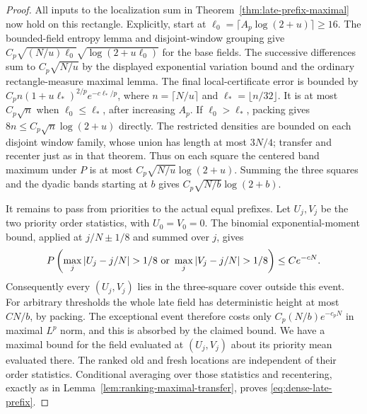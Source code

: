 \documentclass[11pt,letterpaper]{article}
\begin{document}
\begin{proof}
All inputs to the localization sum in
Theorem~\ref{thm:late-prefix-maximal} now hold on this
rectangle. Explicitly, start at
$\ell_0=\lceil A_p\log(2+u)\rceil\ge16$.
The bounded-field entropy lemma and disjoint-window
grouping give
$C_p\sqrt{(N/u)\ell_0}\sqrt{\log(2+u\ell_0)}$
for the base fields. The successive differences sum to
$C_p\sqrt{N/u}$ by the displayed exponential variation
bound and the ordinary rectangle-measure maximal lemma.
The final local-certificate error is bounded by
$C_p n(1+u\ell_*)^{2/p}e^{-c\ell_*/p}$, where
$n=\lceil N/u\rceil$ and $\ell_*=\lfloor n/32\rfloor$.
It is at most $C_p\sqrt n$ when $\ell_0\le\ell_*$,
after increasing $A_p$. If $\ell_0>\ell_*$, packing
gives $8n\le C_p\sqrt n\log(2+u)$ directly.
The restricted densities are bounded on each disjoint
window family, whose union has length at most $3N/4$;
transfer and recenter just as in that theorem.
Thus on each square the centered band maximum under $P$
is at most $C_p\sqrt{N/u}\log(2+u)$.
Summing the three squares and the dyadic bands starting
at $b$ gives
$C_p\sqrt{N/b}\log(2+b)$.

It remains to pass from priorities to the actual equal
prefixes. Let $U_j,V_j$ be the two priority order
statistics, with $U_0=V_0=0$.
The binomial exponential-moment bound, applied at
$j/N\pm1/8$ and summed over $j$, gives
\[
 P\left(\max_j|U_j-j/N|>1/8
          \ \hbox{or}\ \max_j|V_j-j/N|>1/8\right)
                                      \le Ce^{-cN}.
\]
Consequently every $(U_j,V_j)$ lies in the three-square
cover outside this event.
For arbitrary thresholds the whole late field has
deterministic height at most $CN/b$, by packing.
The exceptional event therefore costs only
$C_p(N/b)e^{-c_pN}$ in maximal $L^p$ norm, and this is
absorbed by the claimed bound.
We have a maximal bound for the field evaluated at
$(U_j,V_j)$ about its priority mean evaluated there.
The ranked old and fresh locations are independent of
their order statistics. Conditional averaging over
those statistics and recentering, exactly as in
Lemma~\ref{lem:ranking-maximal-transfer}, proves
\eqref{eq:dense-late-prefix}.
\end{proof}
\end{document}

